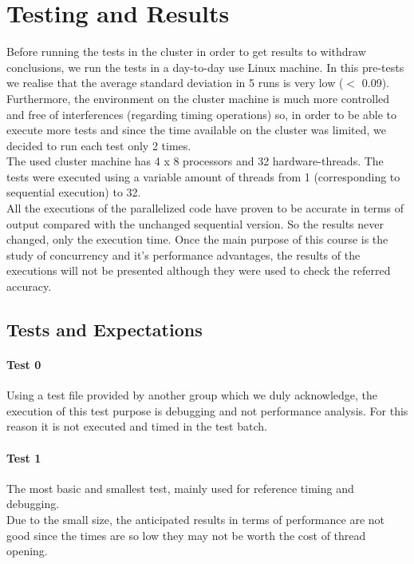\documentclass[10pt,journal,compsoc]{IEEEtran}
\begin{document}
\section{Testing and Results}

Before running the tests in the cluster in order to get results to withdraw conclusions, we run the tests in a day-to-day use Linux machine. In this pre-tests we realise that the average standard deviation in 5 runs is very low ($<$ 0.09). Furthermore, the environment on the cluster machine is much more controlled and free of interferences (regarding timing operations) so, in order to be able to execute more tests and since the time available on the cluster was limited, we decided to run each test only 2 times. 
\\
The used cluster machine has 4 x 8 processors and 32 hardware-threads. The tests were executed using a variable amount of threads from 1 (corresponding to sequential execution) to 32.
\\
All the executions of the parallelized code have proven to be accurate in terms of output compared with the unchanged sequential version. So the results never changed, only the execution time. Once the main purpose of this course is the study of concurrency and it's performance advantages, the results of the executions will not be presented although they were used to check the referred accuracy.

\subsection{Tests and Expectations}
\paragraph*{\textbf{Test 0}}
Using a test file provided by another group which we duly acknowledge, the execution of this test purpose is debugging and not performance analysis. For this reason it is not executed and timed in the test batch.

\paragraph*{\textbf{Test 1}}
The most basic and smallest test, mainly used for reference timing and debugging.
\\
Due to the small size, the anticipated results in terms of performance are not good since the times are so low they may not be worth the cost of thread opening.
\end{document}
